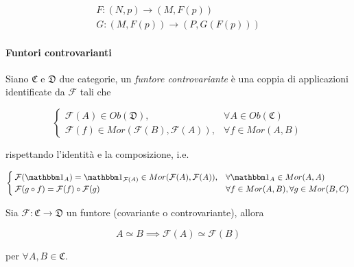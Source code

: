 \begin{gather}
	F : (N,p) \to (M,F(p))\\
	G : (M,F(p)) \to (P,G(F(p)))
\end{gather}

\paragraph{Funtori controvarianti}

Siano $ \mathfrak{C} $ e $ \mathfrak{D} $ due categorie, un \textit{funtore controvariante} è una coppia di applicazioni identificate da $ \mathcal{F} $ tali che

\begin{equation}
	\begin{cases}
		\mathcal{F}(A) \in Ob(\mathfrak{D}), & \forall A \in Ob(\mathfrak{C})\\
		\mathcal{F}(f) \in Mor(\mathcal{F}(B),\mathcal{F}(A)), & \forall f \in Mor(A,B)
	\end{cases}
\end{equation}

rispettando l'identità e la composizione, i.e.

\begin{equation}
	\begin{cases}
		\mathcal{F}(\bigone_{A}) = \bigone_{\mathcal{F}(A)} \in Mor(\mathcal{F}(A),\mathcal{F}(A)), & \forall \bigone_{A} \in Mor(A,A)\\
		\mathcal{F}(g \circ f) = \mathcal{F}(f) \circ \mathcal{F}(g) & \forall f \in Mor(A,B), \forall g \in Mor(B,C)
	\end{cases}
\end{equation}

\begin{remark}
	Sia $ \mathcal{F} : \mathfrak{C} \to \mathfrak{D} $ un funtore (covariante o controvariante), allora
	
	\begin{equation}
		A \simeq B \implies \mathcal{F}(A) \simeq \mathcal{F}(B)
	\end{equation}
	
	per $ \forall A,B \in \mathfrak{C} $.
\end{remark}

